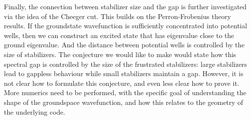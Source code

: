 \documentclass[a4paper,onecolumn,11pt,unpublished]{quantumarticle}
\begin{document}
Finally, the connection between stabilizer size and the gap is further 
investigated via the idea of the Cheeger cut. 
This builds on the Perron-Frobenius theory results.
If the groundstate wavefunction is sufficiently concentrated
into potential wells, then we can construct an excited state
that has eigenvalue close to the ground eigenvalue.
And the distance between potential wells is controlled by
the size of stabilizers.
The conjecture we would like to make would state 
how this spectral gap is controlled by the size of the frustrated
stabilizers: large stabilizers lead to gappless behaviour while
small stabilizers maintain a gap.
However, it is not clear how to formulate this conjecture, and
even less clear how to prove it. 
More numerics need to be performed, with the specific
goal of understanding the shape of the groundspace wavefunction,
and how this relates to the geometry of the underlying code.

%
%
%
%




%




\end{document}
